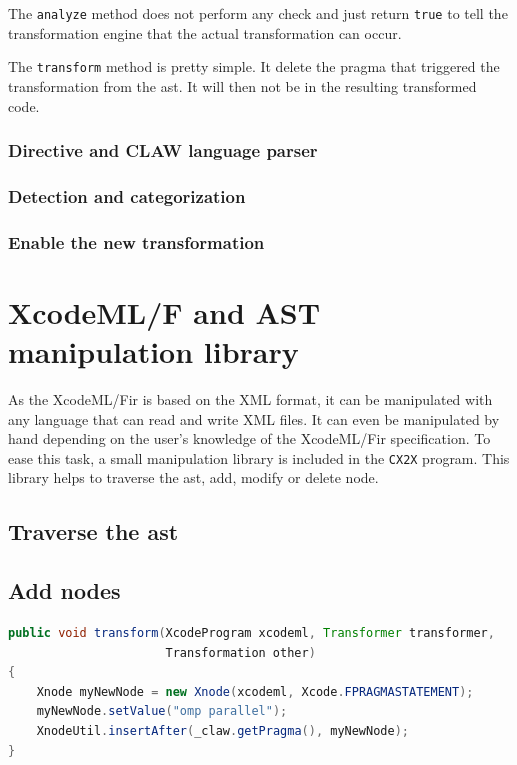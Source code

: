\documentclass[a4paper, 11pt]{report}
\def\xcodeml{XcodeML/F\xspace}
\def\cx2x{\lstinline!CX2X!\xspace}
\begin{document}
The \lstinline|analyze| method does not perform any check and just return 
\lstinline|true| to tell the transformation engine that the actual 
transformation can occur. 

The \lstinline|transform| method is pretty simple. It delete the pragma that 
triggered the transformation from the \gls{ast}. It will then not be in the 
resulting transformed code.

\subsection{Directive and CLAW language parser}

\subsection{Detection and categorization}

\subsection{Enable the new transformation}



\chapter{\xcodeml and AST manipulation library}
\label{chapter:astmanip}
As the \xcodeml \gls{ir} is based on the XML format, it can be manipulated with
any language that can read and write XML files. It can even be manipulated by 
hand depending on the user's knowledge of the \xcodeml \gls{ir} specification. 
To ease this task, a small manipulation library is included in the \cx2x 
program. This library helps to traverse the \gls{ast}, add, modify or delete 
node.

\section{Traverse the \gls{ast}}

\section{Add nodes}

\begin{lstlisting}[label=lst:add_node, language=Java, caption=XcodeML/F add node example]
public void transform(XcodeProgram xcodeml, Transformer transformer,
                      Transformation other)
{                      
    Xnode myNewNode = new Xnode(xcodeml, Xcode.FPRAGMASTATEMENT);
    myNewNode.setValue("omp parallel");
    XnodeUtil.insertAfter(_claw.getPragma(), myNewNode);
}
\end{lstlisting}
\end{document}
